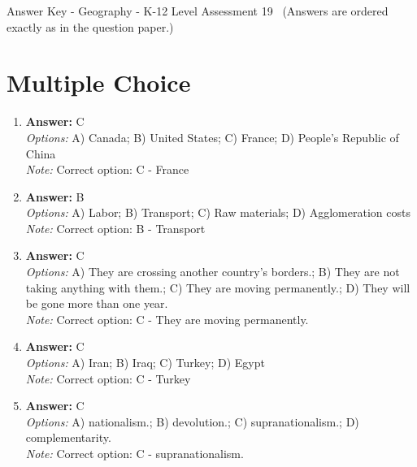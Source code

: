 \documentclass[12pt]{article}
\begin{document}
\begin{center}
Answer Key - Geography - K-12 Level Assessment 19 \
\small (Answers are ordered exactly as in the question paper.)
\end{center}

\section*{Multiple Choice}
\begin{enumerate}[label=\arabic*.]
\item \textbf{Answer:} C
\\ \textit{Options:} A) Canada; B) United States; C) France; D) People's Republic of China
\\ \textit{Note:} Correct option: C - France
\item \textbf{Answer:} B
\\ \textit{Options:} A) Labor; B) Transport; C) Raw materials; D) Agglomeration costs
\\ \textit{Note:} Correct option: B - Transport
\item \textbf{Answer:} C
\\ \textit{Options:} A) They are crossing another country's borders.; B) They are not taking anything with them.; C) They are moving permanently.; D) They will be gone more than one year.
\\ \textit{Note:} Correct option: C - They are moving permanently.
\item \textbf{Answer:} C
\\ \textit{Options:} A) Iran; B) Iraq; C) Turkey; D) Egypt
\\ \textit{Note:} Correct option: C - Turkey
\item \textbf{Answer:} C
\\ \textit{Options:} A) nationalism.; B) devolution.; C) supranationalism.; D) complementarity.
\\ \textit{Note:} Correct option: C - supranationalism.
\end{enumerate}
\end{document}
